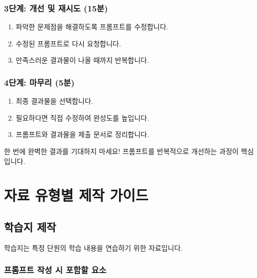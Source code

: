 \documentclass[11pt,a4paper]{article}
\begin{document}
\subsubsection{3단계: 개선 및 재시도 (15분)}

\begin{enumerate}
  \item 파악한 문제점을 해결하도록 프롬프트를 수정합니다.
  \item 수정된 프롬프트로 다시 요청합니다.
  \item 만족스러운 결과물이 나올 때까지 반복합니다.
\end{enumerate}

\subsubsection{4단계: 마무리 (5분)}

\begin{enumerate}
  \item 최종 결과물을 선택합니다.
  \item 필요하다면 직접 수정하여 완성도를 높입니다.
  \item 프롬프트와 결과물을 제출 문서로 정리합니다.
\end{enumerate}

\begin{tipbox}
한 번에 완벽한 결과를 기대하지 마세요! 프롬프트를 반복적으로 개선하는 과정이 핵심입니다.
\end{tipbox}

\newpage

\section{자료 유형별 제작 가이드}

\subsection{학습지 제작}

학습지는 특정 단원의 학습 내용을 연습하기 위한 자료입니다.

\subsubsection{프롬프트 작성 시 포함할 요소}
\end{document}
